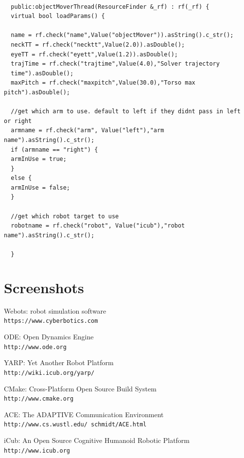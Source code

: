\documentclass[a4paper, 12pt]{report}
\begin{document}
  
  \begin{lstlisting}
  
  public:objectMoverThread(ResourceFinder &_rf) : rf(_rf) {
  virtual bool loadParams() {
  
  name = rf.check("name",Value("objectMover")).asString().c_str();
  neckTT = rf.check("necktt",Value(2.0)).asDouble();
  eyeTT = rf.check("eyett",Value(1.2)).asDouble();
  trajTime = rf.check("trajtime",Value(4.0),"Solver trajectory 
  time").asDouble();
  maxPitch = rf.check("maxpitch",Value(30.0),"Torso max pitch").asDouble();
  
  //get which arm to use. default to left if they didnt pass in left or right
  armname = rf.check("arm", Value("left"),"arm name").asString().c_str();
  if (armname == "right") {
  armInUse = true;
  }
  else {
  armInUse = false;
  }
  
  //get which robot target to use
  robotname = rf.check("robot", Value("icub"),"robot name").asString().c_str();
  
  }
  \end{lstlisting}
  
  \appendix
  \chapter{Screenshots}
  
  \begin{thebibliography}{9}
    Webots: robot simulation software
    \\\texttt{https://www.cyberbotics.com}
    
    ODE: Open Dynamics Engine
    \\\texttt{http://www.ode.org}
    
    YARP: Yet Another Robot Platform 
    \\\texttt{http://wiki.icub.org/yarp/}
    
    CMake: Cross-Platform Open Source Build System 
    \\\texttt{http://www.cmake.org}
    
    ACE: The ADAPTIVE Communication Environment
    \\\texttt{http://www.cs.wustl.edu/~schmidt/ACE.html}
    
    iCub: An Open Source Cognitive Humanoid Robotic Platform
    \\\texttt{http://www.icub.org}
    
  \end{thebibliography}
  
\end{document}
